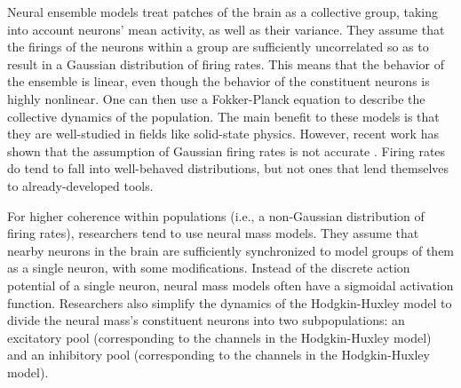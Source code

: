 Neural ensemble models treat patches of the brain as a collective group, taking into account neurons' mean activity, as well as their variance.
They assume that the firings of the neurons within a group are sufficiently uncorrelated so as to result in a Gaussian distribution of firing rates.
This means that the behavior of the ensemble is linear, even though the behavior of the constituent neurons is highly nonlinear.
One can then use a Fokker-Planck equation to describe the collective dynamics of the population.
The main benefit to these models is that they are well-studied in fields like solid-state physics.
However, recent work has shown that the assumption of Gaussian firing rates is not accurate \cite{Breakspear2017}.
Firing rates do tend to fall into well-behaved distributions, but not ones that lend themselves to already-developed tools.

For higher coherence within populations (i.e., a non-Gaussian distribution of firing rates), researchers tend to use neural mass models.
They assume that nearby neurons in the brain are sufficiently synchronized to model groups of them as a single neuron, with some modifications.
Instead of the discrete action potential of a single neuron, neural mass models often have a sigmoidal activation function.
Researchers also simplify the dynamics of the Hodgkin-Huxley model to divide the neural mass's constituent neurons into two subpopulations: an excitatory pool (corresponding to the  channels in the Hodgkin-Huxley model) and an inhibitory pool (corresponding to the  channels in the Hodgkin-Huxley model).

